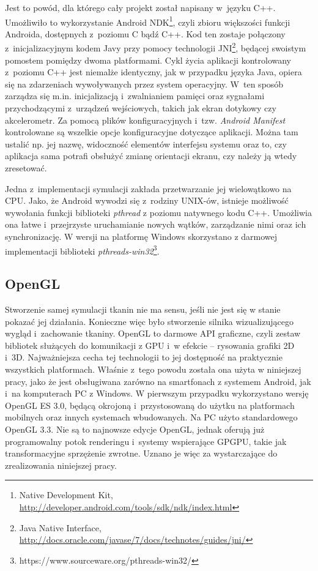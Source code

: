 		Jest to powód, dla którego cały projekt został napisany w~języku C++. Umożliwiło to wykorzystanie Android NDK\footnote{Native Development Kit, \href{http://developer.android.com/tools/sdk/ndk/index.html}{http://developer.android.com/tools/sdk/ndk/index.html}}, czyli zbioru większości funkcji Androida, dostępnych z~poziomu C bądź C++. Kod ten zostaje połączony z~inicjalizacyjnym kodem Javy przy pomocy technologii JNI\footnote{Java Native Interface, \href{http://docs.oracle.com/javase/7/docs/technotes/guides/jni/}{http://docs.oracle.com/javase/7/docs/technotes/guides/jni/}}, będącej swoistym pomostem pomiędzy dwoma platformami. Cykl życia aplikacji kontrolowany z~poziomu C++ jest niemalże identyczny, jak w przypadku języka Java, opiera się na zdarzeniach wywoływanych przez system operacyjny. W~ten sposób zarządza się m.in. inicjalizacją i~zwalnianiem pamięci oraz sygnałami przychodzącymi z~urządzeń wejściowych, takich jak ekran dotykowy czy akcelerometr. Za pomocą plików konfiguracyjnych i~tzw. \emph{Android Manifest} kontrolowane są wszelkie opcje konfiguracyjne dotyczące aplikacji. Można tam ustalić np. jej nazwę, widoczność elementów interfejsu systemu oraz to, czy aplikacja sama potrafi obsłużyć zmianę orientacji ekranu, czy należy ją wtedy zresetować.
		
		Jedna z~implementacji symulacji zakłada przetwarzanie jej wielowątkowo na CPU. Jako, że Android wywodzi się z~rodziny UNIX-ów, istnieje możliwość wywołania funkcji biblioteki \emph{pthread} z poziomu natywnego kodu C++. Umożliwia ona łatwe i~przejrzyste uruchamianie nowych wątków, zarządzanie nimi oraz ich synchronizację. W wersji na platformę Windows skorzystano z darmowej implementacji biblioteki \emph{pthreads-win32}\footnote{https://www.sourceware.org/pthreads-win32/}.
	
		\subsection{OpenGL}
		\label{t:technologie:narzedzia:ogl}
		
		
		Stworzenie samej symulacji tkanin nie ma sensu, jeśli nie jest się w stanie pokazać jej działania. Konieczne więc było stworzenie silnika wizualizującego wygląd i~zachowanie tkaniny. OpenGL to darmowe API graficzne, czyli zestaw bibliotek służących do komunikacji z GPU i~w efekcie -- rysowania grafiki 2D i~3D. Najważniejsza cecha tej technologii to jej dostępność na praktycznie wszystkich platformach. Właśnie z~tego powodu została ona użyta w niniejszej pracy, jako że jest obsługiwana zarówno na smartfonach z systemem Android, jak i~na komputerach PC z Windows. W pierwszym przypadku wykorzystano wersję OpenGL ES 3.0, będącą okrojoną i~przystosowaną do użytku na platformach mobilnych oraz innych systemach wbudowanych. Na PC użyto standardowego OpenGL 3.3. Nie są to najnowsze edycje OpenGL, jednak oferują już programowalny potok renderingu i~systemy wspierające GPGPU, takie jak transformacyjne sprzężenie zwrotne. Uznano je więc za wystarczające do zrealizowania niniejszej pracy.
		
